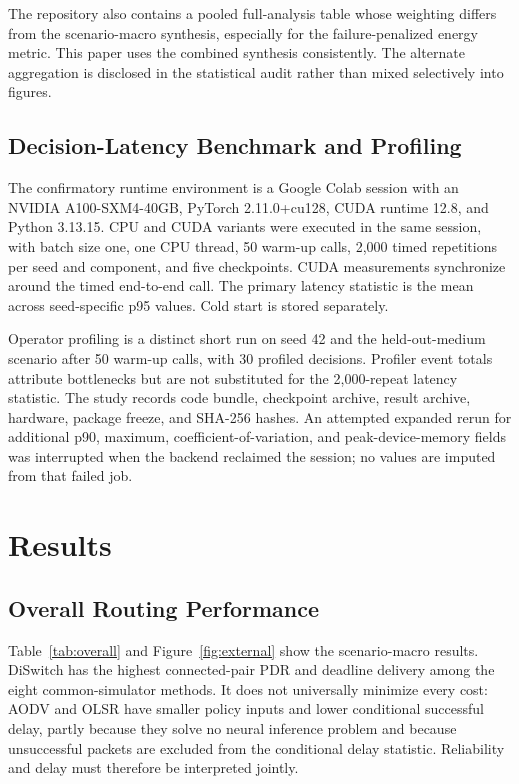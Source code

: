 \documentclass{ieeeaccess}
\newcommand{\DS}{DiSwitch}
\begin{document}
The repository also contains a pooled full-analysis table whose weighting differs from the scenario-macro synthesis, especially for the failure-penalized energy metric. This paper uses the combined synthesis consistently. The alternate aggregation is disclosed in the statistical audit rather than mixed selectively into figures.

\subsection{Decision-Latency Benchmark and Profiling}

The confirmatory runtime environment is a Google Colab session with an NVIDIA A100-SXM4-40GB, PyTorch 2.11.0+cu128, CUDA runtime 12.8, and Python 3.13.15. CPU and CUDA variants were executed in the same session, with batch size one, one CPU thread, 50 warm-up calls, 2,000 timed repetitions per seed and component, and five checkpoints. CUDA measurements synchronize around the timed end-to-end call. The primary latency statistic is the mean across seed-specific p95 values. Cold start is stored separately.

Operator profiling is a distinct short run on seed 42 and the held-out-medium scenario after 50 warm-up calls, with 30 profiled decisions. Profiler event totals attribute bottlenecks but are not substituted for the 2,000-repeat latency statistic. The study records code bundle, checkpoint archive, result archive, hardware, package freeze, and SHA-256 hashes. An attempted expanded rerun for additional p90, maximum, coefficient-of-variation, and peak-device-memory fields was interrupted when the backend reclaimed the session; no values are imputed from that failed job.

\section{Results}

\subsection{Overall Routing Performance}

Table~\ref{tab:overall} and Figure~\ref{fig:external} show the scenario-macro results. \DS{} has the highest connected-pair PDR and deadline delivery among the eight common-simulator methods. It does not universally minimize every cost: AODV and OLSR have smaller policy inputs and lower conditional successful delay, partly because they solve no neural inference problem and because unsuccessful packets are excluded from the conditional delay statistic. Reliability and delay must therefore be interpreted jointly.
\end{document}
